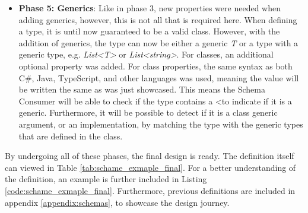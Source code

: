 \begin{itemize}
    \item \textbf{Phase 5: Generics}: Like in phase 3, new properties were needed when adding generics, however, this is not all that is required here. When defining a type, it is until now guaranteed to be a valid class. However, with the addition of generics, the type can now be either a generic \textit{T} or a type with a generic type, e.g. \textit{List\textless T\textgreater} or \textit{List\textless string\textgreater}. For classes, an additional optional property was added. For class properties, the same syntax as both C\#, Java, TypeScript, and other languages was used, meaning the value will be written the same as was just showcased. This means the Schema Consumer will be able to check if the type contains a \textless to indicate if it is a generic. Furthermore, it will be possible to detect if it is a class generic argument, or an implementation, by matching the type with the generic types that are defined in the class.
\end{itemize}
\noindent
By undergoing all of these phases, the final design is ready. The definition itself can viewed in Table \ref{tab:schame_exmaple_final}. For a better understanding of the definition, an example is further included in Listing \ref{code:schame_exmaple_final}. Furthermore, previous definitions are included in appendix \ref{appendix:schemas}, to showcase the design journey.
